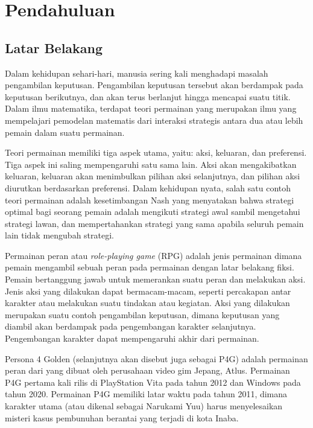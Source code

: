 \chapter{Pendahuluan}

\section{Latar Belakang}
\label{sec:latarbelakang}

Dalam kehidupan sehari-hari, manusia sering kali menghadapi masalah pengambilan keputusan. Pengambilan keputusan tersebut akan berdampak pada keputusan berikutnya, dan akan terus berlanjut hingga mencapai suatu titik. Dalam ilmu matematika, terdapat teori permainan yang merupakan ilmu yang mempelajari pemodelan matematis dari interaksi strategis antara dua atau lebih pemain dalam suatu permainan.

Teori permainan memiliki tiga aspek utama, yaitu: aksi, keluaran, dan preferensi. Tiga aspek ini saling mempengaruhi satu sama lain. Aksi akan mengakibatkan keluaran, keluaran akan menimbulkan pilihan aksi selanjutnya, dan pilihan aksi diurutkan berdasarkan preferensi. Dalam kehidupan nyata, salah satu contoh teori permainan adalah kesetimbangan Nash yang menyatakan bahwa strategi optimal bagi seorang pemain adalah mengikuti strategi awal sambil mengetahui strategi lawan, dan mempertahankan strategi yang sama apabila seluruh pemain lain tidak mengubah strategi.

Permainan peran atau \textit{role-playing game} (RPG) adalah jenis permainan dimana pemain mengambil sebuah peran pada permainan dengan latar belakang fiksi. Pemain bertanggung jawab untuk memerankan suatu peran dan melakukan aksi. Jenis aksi yang dilakukan dapat bermacam-macam, seperti percakapan antar karakter atau melakukan suatu tindakan atau kegiatan. Aksi yang dilakukan merupakan suatu contoh pengambilan keputusan, dimana keputusan yang diambil akan berdampak pada pengembangan karakter selanjutnya. Pengembangan karakter dapat mempengaruhi akhir dari permainan.

Persona 4 Golden (selanjutnya akan disebut juga sebagai P4G) adalah permainan peran dari yang dibuat oleh perusahaan video gim Jepang, Atlus. Permainan P4G pertama kali rilis di PlayStation Vita pada tahun 2012 dan Windows pada tahun 2020. Permainan P4G memiliki latar waktu pada tahun 2011, dimana karakter utama (atau dikenal sebagai Narukami Yuu) harus menyelesaikan misteri kasus pembunuhan berantai yang terjadi di kota Inaba.

